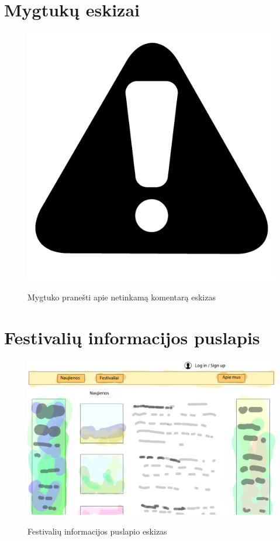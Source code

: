 \documentclass{VUMIFPSkursinis}
\begin{document}
\section{Mygtukų eskizai}
\begin{figure}[H]
    \centering
    \includegraphics[scale=0.5]{img/PSI2priedai/warning-3.png}
    \label{img:warning}
	\caption{Mygtuko pranešti apie netinkamą komentarą eskizas}
\end{figure}

\section{Festivalių informacijos puslapis}
\begin{figure}[H]
    \centering
    \includegraphics[scale=0.35]{img/PSI2priedai/pirmas-01.jpg}
    \label{img:page1}
	\caption{Festivalių informacijos puslapio eskizas}
\end{figure}
\end{document}
